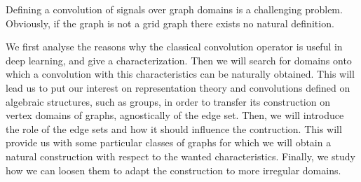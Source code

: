 Defining a convolution of signals over graph domains is a challenging problem. Obviously, if the graph is not a grid graph there exists no natural definition.

We first analyse the reasons why the classical convolution operator is useful in deep learning, and give a characterization. Then we will search for domains onto which a convolution with this characteristics can be naturally obtained. This will lead us to put our interest on representation theory and convolutions defined on algebraic structures, such as groups, in order to transfer its construction on vertex domains of graphs, agnostically of the edge set. Then, we will introduce the role of the edge sets and how it should influence the contruction. This will provide us with some particular classes of graphs for which we will obtain a natural construction with respect to the wanted characteristics. Finally, we study how we can loosen them to adapt the construction to more irregular domains.